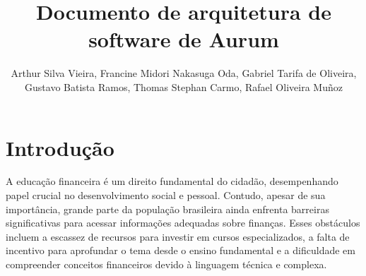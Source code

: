 \documentclass[
	article,			%
	12pt,				%
	oneside,			%
	a4paper,			%
	english,			%
	brazil,				%
	sumario=tradicional
	]{abntex2}
\title{Documento de arquitetura de software de Aurum}
\author{Arthur Silva Vieira\inst{1}, Francine Midori Nakasuga Oda\inst{1}, Gabriel Tarifa de Oliveira\inst{1},\\ Gustavo Batista Ramos\inst{1}, Thomas Stephan Carmo\inst{1},   Rafael Oliveira Muñoz\inst{1} }
\begin{document}


\frenchspacing 


%
%

\maketitle







\textual

\section{Introdução}
    
 A educação financeira é um direito fundamental do cidadão, desempenhando papel crucial no desenvolvimento social e pessoal. Contudo, apesar de sua importância, grande parte da população brasileira ainda enfrenta barreiras significativas para acessar informações adequadas sobre finanças. Esses obstáculos incluem a escassez de recursos para investir em cursos especializados, a falta de incentivo para aprofundar o tema desde o ensino fundamental e a dificuldade em compreender conceitos financeiros devido à linguagem técnica e complexa.
\end{document}

